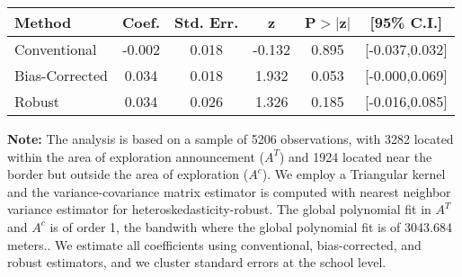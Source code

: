 \begin{table}[htbp]\centering
 \footnotesize 
\begin{tabular}{lccccc}
\hline\hline
Method & Coef. & Std. Err. & z & P$>|$z$|$ & [95\% C.I.] \\ 
\hline \hline  
Conventional & -0.002 & 0.018 & -0.132 & 0.895 & [-0.037,0.032] \\ 
 Bias-Corrected & 0.034 & 0.018 & 1.932 & 0.053 & [-0.000,0.069] \\ 
Robust & 0.034 & 0.026 & 1.326 & 0.185 & [-0.016,0.085] \\ 
  \hline\hline
\end{tabular}
\label{table:rd}
\begin{tablenotes} 
  \justifying \tiny \textbf{Note: }    
   The analysis is based on a sample of 5206 observations, with 3282 located within the area of exploration announcement ($A^{T}$) and 1924 located near the border but outside the area of exploration  ($A^{c}$). 
           We employ a Triangular kernel and the variance-covariance matrix estimator is computed with nearest neighbor variance estimator for heteroskedasticity-robust. The global polynomial fit in  $A^{T}$ and $A^{c}$ is of order 1, the bandwith where the global polynomial fit is of 3043.684 meters.. We estimate all coefficients using conventional, bias-corrected, and robust estimators, and we cluster standard errors at the school level. \end{tablenotes} 
 \end{table} 
